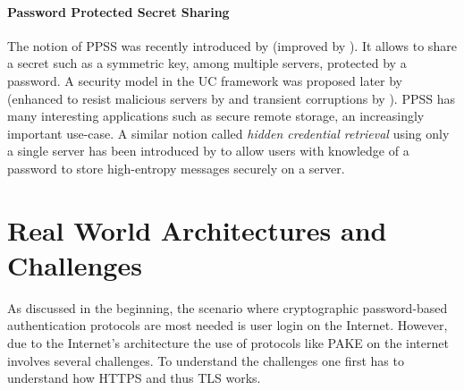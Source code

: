 \paragraph{Password Protected Secret Sharing}
The notion of \acl{PPSS} was recently introduced by \citet{Bagherzandi2011} (improved by \citet{JareckiKK14}).
It allows to share a secret such as a symmetric key, among multiple servers, protected by a password. 
A security model in the \ac{UC} framework was proposed later by \citet{Camenisch2012} (enhanced to resist malicious servers by \citet{CamenischLLN14} and transient corruptions by \citet{CamenischEN15}).
\ac{PPSS} has many interesting applications such as secure remote storage, an increasingly important use-case.
A similar notion called \emph{hidden credential retrieval} using only a single server has been introduced by \citet{Boyen09} to allow users with knowledge of a password to store high-entropy messages securely on a server.


\section{Real World Architectures and Challenges}\label{sec:intro:real-world}
As discussed in the beginning, the scenario where cryptographic password-based authentication protocols are most needed is user login on the Internet.
However, due to the Internet's architecture the use of protocols like \ac{PAKE} on the internet involves several challenges.
To understand the challenges one first has to understand how \ac{HTTPS} and thus \ac{TLS} works.


